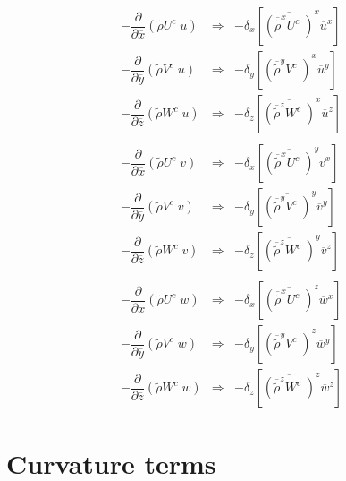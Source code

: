 \begin{eqnarray}
- \dfrac{\partial }{\partial \overline{x}} (\tilde{\rho} U^{c} \;   u )
 & \Longrightarrow & - \delta_{x} \left[
\overline{  \left(
\overline{\tilde{\rho}}^{x} U^{c} \;  \right)}^{x}
\overline{  u  }^{x}
 \right]
  \\
  -  \dfrac{\partial }{\partial \overline{y}} (\tilde{\rho} V^{c} \;   u )
 & \Longrightarrow & - \delta_{y} \left[
\overline{  \left(
\overline{ \tilde{\rho}}^{y} V^{c} \; \right)}^{x} \overline{  u }^{y}
  \right]
\\
 -  \dfrac{\partial }{\partial \overline{z}} (\tilde{\rho} W^{c} \;   u )
 & \Longrightarrow & - \delta _{z} \left[ \overline{  \left(
\overline{\tilde{\rho}}^{z} W^{c} \;  \right)}^{x}
 \overline{ u }^{z}
 \right] \\ \nonumber \\
  -  \dfrac{\partial }{\partial \overline{x}} (\tilde{\rho} U^{c} \;   v )
& \Longrightarrow & - \delta_{x} \left[\overline{  \left(
\overline{\tilde{\rho}}^{x} U^{c} \; \right)}^{y} \overline{  v }^{x}
 \right]
\\
- \dfrac{\partial }{\partial \overline{y}} (\tilde{\rho} V^{c} \;   v )
& \Longrightarrow & - \delta_{y} \left[\overline{  \left(
\overline{ \tilde{\rho}}^{y} V^{c} \; \right)}^{y} \overline{   v }^{y}
\right] \\
   - \dfrac{\partial }{\partial \overline{z}} (\tilde{\rho} W^{c} \;   v )
& \Longrightarrow &  - \delta_{z} \left[ \overline{  \left(
\overline{ \tilde{\rho}}^{z} W^{c} \;  \right)}^{y} \overline{  v }^{z}
\right]  \\ \nonumber \\
  -  \dfrac{\partial }{\partial \overline{x}} (\tilde{\rho} U^{c} \;  w)
& \Longrightarrow &  - \delta_{x} \left[\overline{  \left(
\overline{ \tilde{\rho}}^{x}
 U^{c} \; \right)}^{z} \overline{ w}^{x} \right]
   \\
-  \dfrac{\partial }{\partial \overline{y}} (\tilde{\rho} V^{c} \;  w )
& \Longrightarrow &  - \delta_{y} \left[\overline{  \left(
\overline{ \tilde{\rho}}^{y} V^{c} \; \right)}^{z}\overline{
 w }^{y}\right] \\
 -  \dfrac{\partial }{\partial \overline{z}} (\tilde{\rho} W^{c} \;  w)
& \Longrightarrow &  - \delta_{z} \left[ \overline{  \left(
\overline{ \tilde{\rho}}^{z}  W^{c} \;  \right)}^{z}\overline{w}^{z} \right]
 \end{eqnarray}

\section{Curvature terms}

